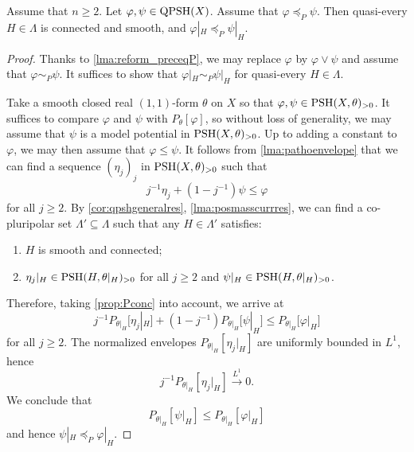 \begin{proposition}\label{prop:varphiP_rest_gen}
    Assume that $n\geq 2$. Let $\varphi,\psi\in \mathrm{QPSH}(X)$. Assume that $\varphi\preceq_P \psi$. Then quasi-every $H\in \Lambda$ is connected and smooth, and $\varphi|_H\preceq_P \psi|_H$.
\end{proposition}
\begin{proof}
    Thanks to \cref{lma:reform_preceqP}, we may replace $\varphi$ by $\varphi\lor \psi$ and assume that $\varphi\sim_P \psi$.
    It suffices to show that $\varphi|_H\sim_P \psi|_H$ for quasi-every $H\in \Lambda$.

    Take a smooth closed real $(1,1)$-form $\theta$ on $X$ so that $\varphi,\psi\in \mathrm{PSH}(X,\theta)_{>0}$. It suffices to compare $\varphi$ and $\psi$ with $P_{\theta}[\varphi]$, so without loss of generality, we may assume that $\psi$ is a model potential in $\mathrm{PSH}(X,\theta)_{>0}$. Up to adding a constant to $\varphi$, we may then assume that $\varphi\leq \psi$. It follows from \cref{lma:pathoenvelope} that we can find a sequence $(\eta_j)_j$ in $\mathrm{PSH}(X,\theta)_{>0}$ such that
    \[
    j^{-1}\eta_j+\left(1-j^{-1}\right)\psi\leq \varphi
    \]
    for all $j\geq 2$. By \cref{cor:qpshgeneralres}, \cref{lma:posmasscurrres}, we can find a co-pluripolar set $\Lambda'\subseteq \Lambda$ such that any $H\in \Lambda'$ satisfies:
    \begin{enumerate}
        \item\label{itm:chapter-trace:L1015:1} $H$ is smooth and connected;
        \item\label{itm:chapter-trace:L1015:2} $\eta_j|_H\in \mathrm{PSH}(H,\theta|_H)_{>0}$ for all $j\geq 2$ and $\psi|_H\in \mathrm{PSH}(H,\theta|_H)_{>0}$.
    \end{enumerate}
    Therefore, taking \cref{prop:Pconc} into account, we arrive at
    \[
    j^{-1} P_{\theta|_H}\bigl[\eta_j|_H\bigr]+\left(1-j^{-1}\right)P_{\theta|_H}\bigl[\psi|_H\bigr]\leq P_{\theta|_H}\bigl[\varphi|_H\bigr]
    \]
    for all $j\geq 2$. The normalized envelopes $P_{\theta|_H}[\eta_j|_H]$ are uniformly bounded in $L^1$, hence
    \[
        j^{-1}P_{\theta|_H}[\eta_j|_H]\xrightarrow{L^1} 0.
    \]
    We conclude that
    \[
    P_{\theta|_H}[\psi|_H]\leq P_{\theta|_H}[\varphi|_H]
    \]
    and hence $\psi|_H\preceq_P \varphi|_H$.
\end{proof}

